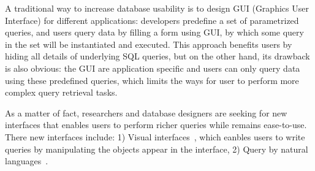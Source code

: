 \documentclass[preprint]{sigplanconf}
\begin{document}
A traditional way to increase database usability is to design GUI (Graphics User Interface) for different applications: developers predefine a set of parametrized queries, and users query data by filling a form using GUI, by which some query in the set will be instantiated and executed. This approach benefits users by hiding all details of underlying SQL queries, but on the other hand, its drawback is also obvious: the GUI are application specific and users can only query data using these predefined queries, which limits the ways for user to perform more complex query retrieval tasks. 

As a matter of fact, researchers and database designers are seeking for new interfaces that enables users to perform richer queries while remains ease-to-use. There new interfaces include: 1) Visual interfaces~\cite{sengupta1997query,murray1998kaleidoquery}, which eanbles users to write queries by manipulating the objects appear in the interface, 2) Query by natural languages~\cite{gulwani2014nlyze,li2014constructing}.










{}

\end{document}
